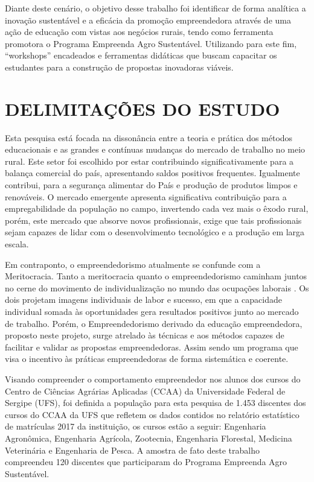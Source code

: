 Diante deste cenário, o objetivo desse trabalho foi identificar de forma analítica a inovação sustentável e a eficácia da promoção empreendedora através de uma ação de educação com vistas aos negócios rurais, tendo como ferramenta promotora o Programa Empreenda Agro Sustentável. Utilizando para este fim, “workshops” encadeados e ferramentas didáticas que buscam capacitar os estudantes para a construção de propostas inovadoras viáveis.

\section{DELIMITAÇÕES DO ESTUDO}

Esta pesquisa está focada na dissonância entre a teoria e prática dos métodos educacionais e as grandes e contínuas mudanças do mercado de trabalho no meio rural. Este setor foi escolhido por estar contribuindo significativamente para a balança comercial do país, apresentando saldos positivos frequentes. Igualmente contribui, para a segurança alimentar do País e produção de produtos limpos e renováveis. O mercado emergente apresenta significativa contribuição para a empregabilidade da população no campo, invertendo cada vez mais o êxodo rural, porém, este mercado que absorve novos profissionais, exige que tais profissionais sejam capazes de lidar com o desenvolvimento tecnológico e a produção em larga escala. 

Em contraponto, o empreendedorismo atualmente se confunde com a Meritocracia. Tanto a meritocracia quanto o empreendedorismo caminham juntos no cerne do movimento de individualização no mundo das ocupações laborais \cite{costa_novo_2019}. Os dois projetam imagens individuais de labor e sucesso, em que a capacidade individual somada às oportunidades gera resultados positivos junto ao mercado de trabalho. Porém, o Empreendedorismo derivado da educação empreendedora, proposto neste projeto, surge atrelado às técnicas e aos métodos capazes de facilitar e validar as propostas empreendedoras. Assim sendo um programa que visa o incentivo às práticas empreendedoras de forma sistemática e coerente.

Visando compreender o comportamento empreendedor nos alunos dos cursos do Centro de Ciências Agrárias Aplicadas (CCAA) da Universidade Federal de Sergipe (UFS), foi definida a população para esta pesquisa de 1.453 discentes dos cursos do CCAA da UFS que refletem os dados contidos no relatório estatístico de matrículas 2017 da instituição, os cursos estão a seguir: Engenharia Agronômica, Engenharia Agrícola, Zootecnia, Engenharia Florestal, Medicina Veterinária e Engenharia de Pesca. A amostra de fato deste trabalho compreendeu 120 discentes que participaram do Programa Empreenda Agro Sustentável.

